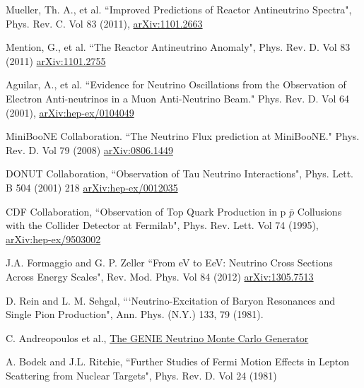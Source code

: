 \begin{thebibliography}{20}
Mueller, Th. A., et al. ``Improved Predictions of Reactor Antineutrino Spectra", Phys. Rev. C. Vol 83 (2011), \href{https://arxiv.org/pdf/1101.2663.pdf}{arXiv:1101.2663}

Mention, G., et al. ``The Reactor Antineutrino Anomaly", Phys. Rev. D. Vol 83 (2011) \href{https://arxiv.org/abs/1101.2755}{arXiv:1101.2755}

Aguilar, A., et al. ``Evidence for Neutrino Oscillations from the Observation of Electron Anti-neutrinos in a Muon Anti-Neutrino Beam." Phys. Rev. D. Vol 64 (2001), \href{https://arxiv.org/abs/hep-ex/0104049}{arXiv:hep-ex/0104049}

MiniBooNE Collaboration. ``The Neutrino Flux prediction at MiniBooNE." Phys. Rev. D. Vol 79 (2008) \href{https://arxiv.org/abs/0806.1449}{arXiv:0806.1449}

DONUT Collaboration, ``Observation of Tau Neutrino Interactions", Phys. Lett. B 504 (2001) 218 \href{https://arxiv.org/abs/hep-ex/0012035}{arXiv:hep-ex/0012035}

CDF Collaboration, ``Observation of Top Quark Production in p $\overline{p}$ Collusions with the Collider Detector at Fermilab", Phys. Rev. Lett. Vol 74 (1995), \href{https://arxiv.org/abs/hep-ex/9503002}{arXiv:hep-ex/9503002}


J.A. Formaggio and G. P. Zeller ``From eV to EeV: Neutrino Cross Sections Across Energy Scales", Rev. Mod. Phys. Vol 84 (2012) \href{https://arxiv.org/pdf/1305.7513.pdf}{arXiv:1305.7513}

D. Rein and L. M. Sehgal, ```Neutrino-Excitation of Baryon Resonances and Single Pion Production",
Ann. Phys. (N.Y.) 133, 79 (1981).


  C. Andreopoulos et al., \href{http://aip.scitation.org/doi/pdf/10.1063/1.457108}{The GENIE Neutrino Monte Carlo Generator}

A. Bodek and J.L. Ritchie, ``Further Studies of Fermi Motion Effects in Lepton Scattering from Nuclear Targets", Phys. Rev. D. Vol 24 (1981) %


\end{thebibliography}
